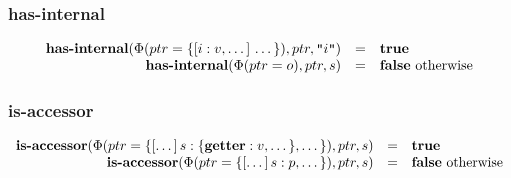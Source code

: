 \documentclass[draft, 10pt]{article}
\newcommand{\str}[0]{s}
\newcommand{\id}[0]{i}
\newcommand{\true}[0]{\textbf{true}}
\newcommand{\false}[0]{\textbf{false}}
\newcommand{\paget}[0]{\textbf{getter}}
\newcommand{\opisaccessor}[0]{\textbf{is-accessor}}
\newcommand{\ophasinternal}[0]{\textbf{has-internal}}
\newcommand{\heap}[0]{\Phi}
\newcommand{\mapadd}[3]{#1(#2 = #3)}
\newcommand{\bigval}[0]{v}
\newcommand{\oprop}[0]{p}
\newcommand{\obj}[0]{o}
\newcommand{\objlit}[2]{\{[#1]\thinspace#2\}}
\newcommand{\heapptr}{ptr}
\newcommand{\runbinop}[4]{#1(#2,#3,#4)}
\begin{document}
\subsubsection{has-internal}

\[
\begin{array}{rcl}
\runbinop{\ophasinternal}{\mapadd{\heap}{\heapptr}{\objlit{\id : \bigval, \dots}{\dots}}}{\heapptr}{\texttt{"}\id\texttt{"}} &=& \true \\
\runbinop{\ophasinternal}{\mapadd{\heap}{\heapptr}{\obj}}{\heapptr}{\str} &=& \false \textrm{ otherwise}
\end{array}
\]

\subsubsection{is-accessor}

\[
\begin{array}{rcl}
\runbinop{\opisaccessor}{\mapadd{\heap}{\heapptr}{\objlit{\dots}{\str : \{\paget : \bigval, \dots\}, \dots}}}{\heapptr}{\str} &=& \true \\
\runbinop{\opisaccessor}{\mapadd{\heap}{\heapptr}{\objlit{\dots}{\str : \oprop, \dots}}}{\heapptr}{\str} &=& \false \textrm{ otherwise} 
\end{array}
\]
\end{document}
